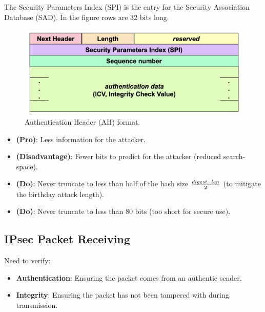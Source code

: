 \begin{multicols}{2}
\raggedcolumns
    
\begin{tcolorbox}[colback=blue!10!white, colframe=blue!50!white, title=Insight]
    The Security Parameters Index (SPI) is the entry for the Security Association Database (SAD). In the figure rows are 32 bits long.
    \end{tcolorbox}
\columnbreak

    
\begin{figure}[H]
    \centering
    \includegraphics[width=\linewidth]{Images/NetSec/AH_format.png}
    \caption{Authentication Header (AH) format.}
\end{figure}
\end{multicols}

\begin{tcolorbox}[colback=blue!10!white, colframe=blue!50!white, title={For Any Truncated MAC}]
    \begin{itemize}
        \item \textbf{(Pro)}: Less information for the attacker.
        \item \textbf{(Disadvantage)}: Fewer bits to predict for the attacker (reduced search-space).
        \item \textbf{(Do)}: Never truncate to less than half of the hash size $digest\_len\over 2$ (to mitigate the birthday attack length).
        \item \textbf{(Do)}: Never truncate to less than 80 bits (too short for secure use).
    \end{itemize}
\end{tcolorbox}




\clearpage
\subsection{IPsec Packet Receiving}
Need to verify:
\begin{itemize}
    \item \textbf{Authentication}: Ensuring the packet comes from an authentic sender.
    \item \textbf{Integrity}: Ensuring the packet has not been tampered with during transmission.
\end{itemize}

